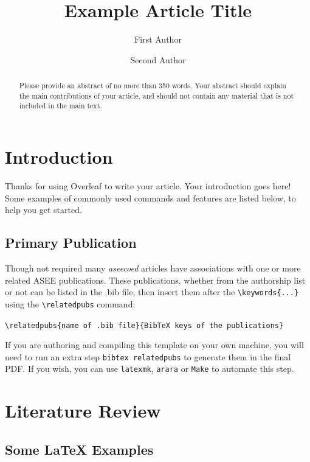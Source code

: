 \documentclass[lineno,10pt]{aseecoed}
\title{Example Article Title}
\author[1][corr.author@xyz.ac.mm]{First Author}
\author[2]{Second Author}
\affil[1]{Address of first author}
\affil[2]{Address of second author}
\begin{document}
\maketitle

\begin{abstract}
Please provide an abstract of no more than 350 words. Your abstract should explain the main contributions of your article, and should not contain any material that is not included in the main text. 
\end{abstract}



\section{Introduction}

Thanks for using Overleaf to write your article. Your introduction goes here! Some examples of commonly used commands and features are listed below, to help you get started.

\subsection{Primary Publication}

Though not required many \emph{aseecoed} articles have associations with one or more related ASEE publications. These publications, whether from the authorship list or not can be listed in the .bib file, then insert them after the \verb|\keywords{...}| using the \verb|\relatedpubs| command:

\verb|\relatedpubs{name of .bib file}{BibTeX keys of the publications}|

If you are authoring and compiling this template on your own machine, you will need to run an extra step \verb|bibtex relatedpubs| to generate them in the final PDF. If you wish, you can use \texttt{latexmk}, \texttt{arara} or \texttt{Make} to automate this step.


\section{Literature Review}



\subsection{Some \LaTeX{} Examples}
\label{sec:examples}
\end{document}
